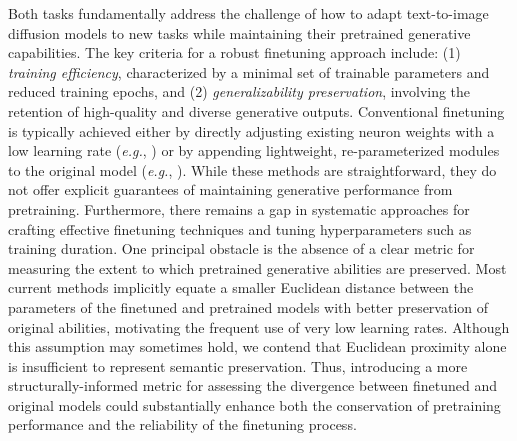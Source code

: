 Both tasks fundamentally address the challenge of how to adapt text-to-image diffusion models to new tasks while maintaining their pretrained generative capabilities. The key criteria for a robust finetuning approach include: (1) \emph{training efficiency}, characterized by a minimal set of trainable parameters and reduced training epochs, and (2) \emph{generalizability preservation}, involving the retention of high-quality and diverse generative outputs. Conventional finetuning is typically achieved either by directly adjusting existing neuron weights with a low learning rate (\emph{e.g.}, \cite{ruiz2023dreambooth}) or by appending lightweight, re-parameterized modules to the original model (\emph{e.g.}, \cite{hulora2022,zhang2023adding}). While these methods are straightforward, they do not offer explicit guarantees of maintaining generative performance from pretraining. Furthermore, there remains a gap in systematic approaches for crafting effective finetuning techniques and tuning hyperparameters such as training duration. One principal obstacle is the absence of a clear metric for measuring the extent to which pretrained generative abilities are preserved. Most current methods implicitly equate a smaller Euclidean distance between the parameters of the finetuned and pretrained models with better preservation of original abilities, motivating the frequent use of very low learning rates. Although this assumption may sometimes hold, we contend that Euclidean proximity alone is insufficient to represent semantic preservation. Thus, introducing a more structurally-informed metric for assessing the divergence between finetuned and original models could substantially enhance both the conservation of pretraining performance and the reliability of the finetuning process.

